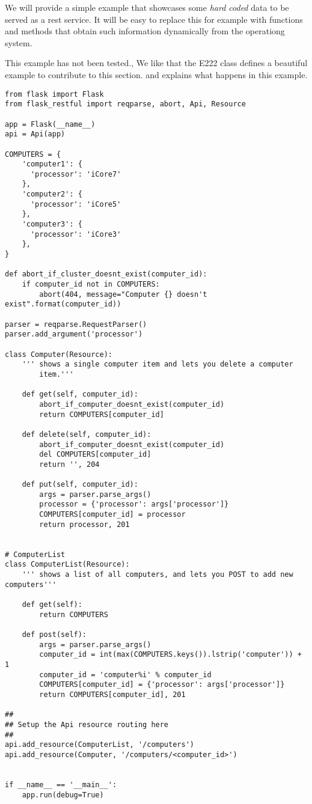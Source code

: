 We will provide a simple example that showcases some \textit{hard coded}
data to be served as a rest service. It will be easy to replace this
for example with functions and methods that obtain such information
dynamically from the operationg system. 

\begin{WARNING}
This example has not been tested., We like that the E222 class defines
a beautiful example to contribute to this section. and explains what
happens in this example.
\end{WARNING}


\begin{lstlisting}
from flask import Flask
from flask_restful import reqparse, abort, Api, Resource

app = Flask(__name__)
api = Api(app)

COMPUTERS = {
    'computer1': {
      'processor': 'iCore7'
    },
    'computer2': {
      'processor': 'iCore5'
    },
    'computer3': {
      'processor': 'iCore3'
    },
}

def abort_if_cluster_doesnt_exist(computer_id):
    if computer_id not in COMPUTERS:
        abort(404, message="Computer {} doesn't exist".format(computer_id))

parser = reqparse.RequestParser()
parser.add_argument('processor')

class Computer(Resource):
    ''' shows a single computer item and lets you delete a computer
        item.'''

    def get(self, computer_id):
        abort_if_computer_doesnt_exist(computer_id)
        return COMPUTERS[computer_id]

    def delete(self, computer_id):
        abort_if_computer_doesnt_exist(computer_id)
        del COMPUTERS[computer_id]
        return '', 204

    def put(self, computer_id):
        args = parser.parse_args()
        processor = {'processor': args['processor']}
        COMPUTERS[computer_id] = processor
        return processor, 201


# ComputerList
class ComputerList(Resource):
    ''' shows a list of all computers, and lets you POST to add new computers'''

    def get(self):
        return COMPUTERS

    def post(self):
        args = parser.parse_args()
        computer_id = int(max(COMPUTERS.keys()).lstrip('computer')) + 1
        computer_id = 'computer%i' % computer_id
        COMPUTERS[computer_id] = {'processor': args['processor']}
        return COMPUTERS[computer_id], 201

##
## Setup the Api resource routing here
##
api.add_resource(ComputerList, '/computers')
api.add_resource(Computer, '/computers/<computer_id>')


if __name__ == '__main__':
    app.run(debug=True)
\end{lstlisting}


